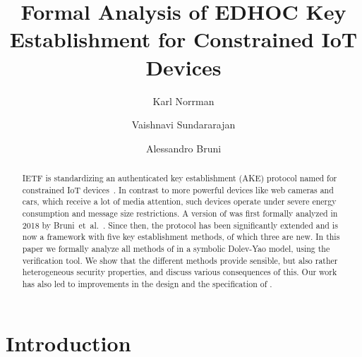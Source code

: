 \documentclass[runningheads, envcountsame, a4paper, draft, x11names]{llncs}
\newcommand{\fillhack}{\vspace{-0.5em}}
\begin{document}
\title{Formal Analysis of EDHOC Key Establishment for Constrained IoT Devices}
\author{Karl Norrman \and
Vaishnavi Sundararajan \and
Alessandro Bruni
}
%
%
%
\maketitle
%

\begin{abstract}
IETF is standardizing an authenticated key establishment (AKE) protocol
named \mEdhoc{} for constrained IoT devices~\cite{selander-lake-edhoc-01}.
%
In contrast to more powerful devices like web cameras and cars, which receive a
lot of media attention, such devices operate under severe energy consumption
and message size restrictions.
%
A version of \mEdhoc{} was first formally analyzed in 2018 by
Bruni~et~al.~\cite{DBLP:conf/secsr/BruniJPS18}.
%
Since then, the protocol has been significantly extended and is now a
framework with five key establishment methods, of which three are new.
%
In this paper we formally analyze all methods of \mEdhoc{} in a symbolic
Dolev-Yao model, using the \mTamarin{} verification tool.
%
We show that the different methods provide sensible, but also rather
heterogeneous security properties, and discuss various consequences of this.
%
Our work has also led to improvements in the design and the specification of
\mEdhoc.
%
\end{abstract}
%


\section{Introduction}
\label{sec:introduction}
\fillhack
\end{document}

